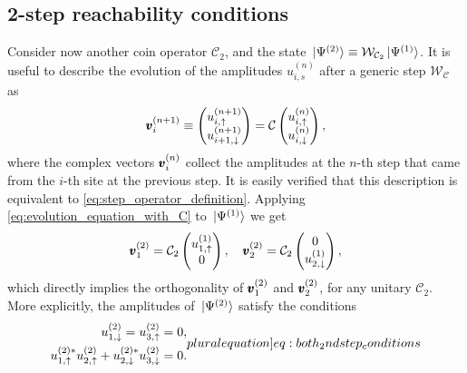 \subsection{2-step reachability conditions}
\label{sec:2step_reachability}
Consider now another coin operator $\mathcal C_2$, and the state
$\ket*{\Psi^{(2)}} \equiv \mathcal W_{\mathcal C_2} \ket*{\Psi^{(1)}}$.
It is useful to describe the evolution of the amplitudes $u_{i, s}^{(n)}$ after a generic step $\mathcal W_{\mathcal C}$ as
\begin{equation}
	\pmb{v}_i^{(n+1)} \equiv
	\begin{pmatrix}
		u^{(n+1)}_{i, \uparrow} \\ u^{(n+1)}_{i+1, \downarrow}
	\end{pmatrix}
	= \mathcal C
	\begin{pmatrix}
		u^{(n)}_{i, \uparrow} \\ u^{(n)}_{i, \downarrow}
	\end{pmatrix},
	\label{eq:evolution_equation_with_C}
\end{equation}
where the complex vectors $\pmb{v}_i^{(n)}$ collect the amplitudes at the $n$-th step that came from the $i$-th site at the previous step.
It is easily verified that this description is equivalent to \cref{eq:step_operator_definition}.
Applying \cref{eq:evolution_equation_with_C} to $\ket*{\Psi^{(1)}}$ we get
\begin{equation}
	\pmb{v}^{(2)}_1
	=
	\mathcal C_2
	\begin{pmatrix}
		u^{(1)}_{1,\uparrow} \\ 0
	\end{pmatrix},
	\quad
	\pmb{v}^{(2)}_2
	=
	\mathcal C_2
	\begin{pmatrix}
		0 \\ u^{(1)}_{2,\downarrow} 
	\end{pmatrix},
	\label{eq:leading_to_first_orthogonality}
\end{equation}
which directly implies the orthogonality of
$\pmb{v}_1^{(2)}$ and $\pmb{v}_{2}^{(2)}$,
for any unitary $\mathcal C_2$.
More explicitly, the amplitudes of $\ket*{\Psi^{(2)}}$ satisfy the conditions
\begin{subequations}
	\begin{align}
		u^{(2)}_{1, \downarrow} = u^{(2)}_{3, \uparrow} = 0,
		\label{eq:vanishing_endpoints_after_2steps}\\
		u^{(2)*}_{1, \uparrow} u^{(2)}_{2, \uparrow}
		+ u^{(2)*}_{2, \downarrow} u^{(2)}_{3, \downarrow} = 0.
		\label{eq:1st_orthogonality_condition}
	\end{align}
	\label[pluralequation]{eq:both_2ndstep_conditions}
\end{subequations}
